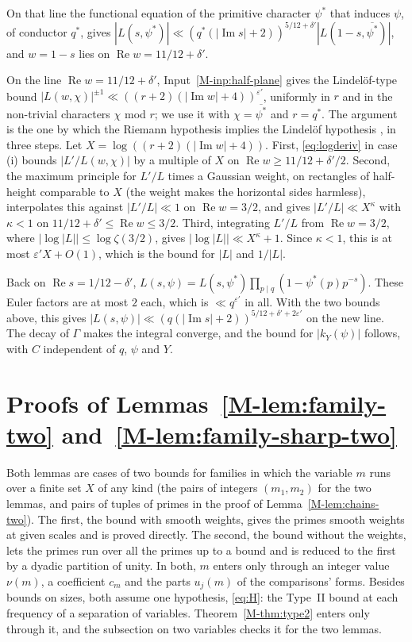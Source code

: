 \documentclass[11pt]{article}
\numberwithin{equation}{section}
\begin{document}
On that line the functional equation of the primitive character $\psi^*$ that induces $\psi$, of conductor $q^*$, gives
$|L(s, \psi^*)| \ll (q^*(|\operatorname{Im} s| + 2))^{5/12 + \delta'} |L(1 - s, \overline{\psi^*})|$, and $w = 1 - s$ lies
on $\operatorname{Re} w = 11/12 + \delta'$.

On the line $\operatorname{Re} w = 11/12 + \delta'$, Input~\ref{M-inp:half-plane} gives the Lindelöf-type bound
$|L(w, \chi)|^{\pm 1} \ll ((r + 2)(|\operatorname{Im} w| + 4))^{\varepsilon'}$, uniformly in $r$ and in the
non-trivial characters $\chi$ mod $r$; we use it with $\chi = \overline{\psi^*}$ and $r = q^*$. The argument is the
one by which the Riemann hypothesis implies the Lindelöf hypothesis \cite[\S 14.2]{titchmarsh}, in three steps. Let
$X = \log((r + 2)(|\operatorname{Im} w| + 4))$. First, \eqref{eq:logderiv} in case (i) bounds $|L'/L(w, \chi)|$ by a
multiple of $X$ on $\operatorname{Re} w \ge 11/12 + \delta'/2$. Second, the maximum principle for $L'/L$ times a Gaussian
weight, on rectangles of half-height comparable to $X$ (the weight makes the horizontal sides harmless), interpolates
this against $|L'/L| \ll 1$ on $\operatorname{Re} w = 3/2$, and gives $|L'/L| \ll X^\kappa$ with $\kappa < 1$ on
$11/12 + \delta' \le \operatorname{Re} w \le 3/2$. Third, integrating $L'/L$ from $\operatorname{Re} w = 3/2$, where
$|\log |L|| \le \log \zeta(3/2)$, gives $|\log |L|| \ll X^\kappa + 1$. Since $\kappa < 1$, this is at most
$\varepsilon' X + O(1)$, which is the bound for $|L|$ and $1/|L|$.

Back on $\operatorname{Re} s = 1/12 - \delta'$, $L(s, \psi) = L(s, \psi^*) \prod_{p \mid q} (1 - \psi^*(p) p^{-s})$.
These Euler factors are at most $2$ each, which is $\ll q^{\varepsilon'}$ in all. With the two bounds above, this gives
$|L(s, \psi)| \ll (q(|\operatorname{Im} s| + 2))^{5/12 + \delta' + 2\varepsilon'}$ on the new line. The decay of
$\Gamma$ makes the integral converge, and the bound for $|k_Y(\psi)|$ follows, with $C$ independent of $q$, $\psi$
and $Y$.

\section{Proofs of Lemmas~\ref{M-lem:family-two} and~\ref{M-lem:family-sharp-two}}\label{app:family}

Both lemmas are cases of two bounds for families in which the variable $m$ runs over a finite set $X$ of any kind (the
pairs of integers $(m_1, m_2)$ for the two lemmas, and pairs of tuples of primes in the proof of
Lemma~\ref{M-lem:chains-two}). The first, the bound with smooth weights, gives the primes smooth weights at given scales
and is proved directly. The second, the bound without the weights, lets the primes run over all the primes up to a bound
and is reduced to the first by a dyadic partition of unity. In both, $m$ enters only through an integer value $\nu(m)$,
a coefficient $c_m$ and the parts $u_j(m)$ of the comparisons' forms. Besides bounds on sizes, both assume one
hypothesis, \eqref{eq:H}: the Type~II
bound at each frequency of a separation of variables. Theorem~\ref{M-thm:type2} enters only through it, and the
subsection on two variables checks it for the two lemmas.
\end{document}
